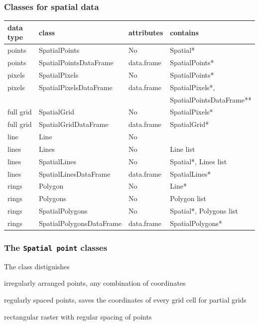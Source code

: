 \documentclass[xcolor=table, xcolor=dvipsnames]{beamer}\usepackage[]{graphicx}\usepackage[]{color}
\newcommand{\rcode}[1]{\texttt{\textcolor{Blue}{#1}}} %
\begin{document}

\begin{frame}[fragile]\frametitle{Classes for spatial data}
\footnotesize
\begin{tabular}{llll}
data type & class                    & attributes & contains\\
\hline
points    & SpatialPoints            & No         & Spatial*\\
points    & SpatialPointsDataFrame   & data.frame & SpatialPoints*\\
pixels    & SpatialPixels            & No         & SpatialPoints*\\
pixels    & SpatialPixelsDataFrame   & data.frame & SpatialPixels*,\\
          &                          &            & SpatialPointsDataFrame**\\
full grid & SpatialGrid              & No         & SpatialPixels*\\
full grid & SpatialGridDataFrame     & data.frame & SpatialGrid*\\
line      & Line                     & No         & \\
lines     & Lines                    & No         & Line list\\
lines     & SpatialLines             & No         & Spatial*, Lines list\\
lines     & SpatialLinesDataFrame    & data.frame & SpatialLines*\\
rings     & Polygon                  & No         & Line*\\
rings     & Polygons                 & No         & Polygon list \\
rings     & SpatialPolygons          & No         & Spatial*, Polygons list \\
rings     & SpatialPolygonsDataFrame & data.frame & SpatialPolygons*\\
\end{tabular}
\end{frame}


\begin{frame}[fragile]\frametitle{The \texttt{Spatial point} classes}
The class distiguishes 
\pause
\begin{description}[<+->]
\item[\rcode{points}]{irregularly arranged points, any combination of coordinates}
\item[\rcode{pixels}]{regularly spaced points, saves the coordinates of every grid cell for partial grids}
\item[\rcode{grid}]{rectangular raster with regular spacing of points}
\end{description}
\end{frame}
\end{document}
